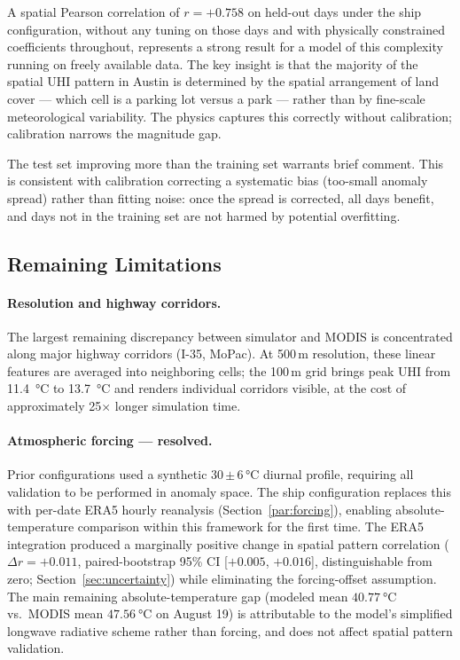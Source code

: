 \documentclass[12pt, letterpaper]{article}
\begin{document}
A spatial Pearson correlation of $r = +0.758$ on held-out days under the
ship configuration, without any tuning on those days and with physically
constrained coefficients throughout, represents a strong result for a model
of this complexity running on freely available data. The key insight is that
the majority of the spatial UHI pattern in Austin is determined by the
spatial arrangement of land cover — which cell is a parking lot versus a
park — rather than by fine-scale meteorological variability. The physics
captures this correctly without calibration; calibration narrows the
magnitude gap.

The test set improving more than the training set warrants brief comment.
This is consistent with calibration correcting a systematic bias (too-small
anomaly spread) rather than fitting noise: once the spread is corrected,
all days benefit, and days not in the training set are not harmed by
potential overfitting.

\subsection{Remaining Limitations}
\label{sec:limitations}

\paragraph{Resolution and highway corridors.}
The largest remaining discrepancy between simulator and MODIS is
concentrated along major highway corridors (I-35, MoPac). At 500\,m
resolution, these linear features are averaged into neighboring cells;
the 100\,m grid brings peak UHI from \SI{11.4}{\degreeCelsius} to
\SI{13.7}{\degreeCelsius} and renders individual corridors visible, at the
cost of approximately 25$\times$ longer simulation time.

\paragraph{Atmospheric forcing — resolved.}
Prior configurations used a synthetic 30\,$\pm$\,6\,\si{\degreeCelsius}
diurnal profile, requiring all validation to be performed in anomaly space.
The ship configuration replaces this with per-date ERA5 hourly reanalysis
(Section~\ref{par:forcing}), enabling absolute-temperature comparison within
this framework for the first time. The ERA5 integration produced a marginally positive change in spatial
pattern correlation ($\Delta r = +0.011$, paired-bootstrap 95\% CI
[$+0.005$, $+0.016$], distinguishable from zero;
Section~\ref{sec:uncertainty}) while eliminating the forcing-offset
assumption. The main remaining
absolute-temperature gap (modeled mean $\SI{40.77}{\degreeCelsius}$ vs.\
MODIS mean $\SI{47.56}{\degreeCelsius}$ on August 19) is attributable to
the model's simplified longwave radiative scheme rather than forcing, and
does not affect spatial pattern validation.
\end{document}
